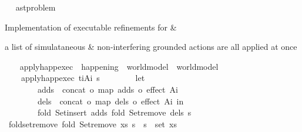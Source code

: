 \begin{isabellebody}
\ %
%
\isadelimdocument
%
\endisadelimdocument
%
\isatagdocument
%
\isamarkuptrue%
%
\endisatagdocument
{\isafolddocument}%
%
\isadelimdocument
%
\endisadelimdocument
{}\isamarkupfalse%
\ ast{\isacharunderscore}{\kern0pt}problem\ %
\begin{isamarkuptext}%
Implementation of executable refinements for  
  \& %
\end{isamarkuptext}\isamarkuptrue%
%
\begin{isamarkuptext}%
a list of simulataneous \& non-interfering grounded actions are all applied at once%
\end{isamarkuptext}\isamarkuptrue%
\ \ \isamarkupfalse%
\ apply{\isacharunderscore}{\kern0pt}happ{\isacharunderscore}{\kern0pt}exec\ {\isacharcolon}{\kern0pt}{\isacharcolon}{\kern0pt}\ {\isachardoublequoteopen}happening\ {\isasymRightarrow}\ world{\isacharunderscore}{\kern0pt}model\ {\isasymRightarrow}\ world{\isacharunderscore}{\kern0pt}model{\isachardoublequoteclose}\ \isanewline
\ \ \ \ {\isachardoublequoteopen}apply{\isacharunderscore}{\kern0pt}happ{\isacharunderscore}{\kern0pt}exec\ {\isacharparenleft}{\kern0pt}t\isactrlsub i{\isacharcomma}{\kern0pt}A\isactrlsub i{\isacharparenright}{\kern0pt}\ s\ {\isacharequal}{\kern0pt}\ \isanewline
\ \ \ \ \ \ {\isacharparenleft}{\kern0pt}let\ \isanewline
\ \ \ \ \ \ \ \ adds\ {\isacharequal}{\kern0pt}\ {\isacharparenleft}{\kern0pt}concat\ o\ {\isacharparenleft}{\kern0pt}map\ {\isacharparenleft}{\kern0pt}adds\ o\ effect{\isacharparenright}{\kern0pt}{\isacharparenright}{\kern0pt}{\isacharparenright}{\kern0pt}\ A\isactrlsub i{\isacharsemicolon}{\kern0pt}\ \isanewline
\ \ \ \ \ \ \ \ dels\ {\isacharequal}{\kern0pt}\ {\isacharparenleft}{\kern0pt}concat\ o\ {\isacharparenleft}{\kern0pt}map\ {\isacharparenleft}{\kern0pt}dels\ o\ effect{\isacharparenright}{\kern0pt}{\isacharparenright}{\kern0pt}{\isacharparenright}{\kern0pt}\ A\isactrlsub i\ in\ \isanewline
\ \ \ \ \ \ \ \ fold\ Set{\isachardot}{\kern0pt}insert\ adds\ {\isacharparenleft}{\kern0pt}fold\ Set{\isachardot}{\kern0pt}remove\ dels\ s{\isacharparenright}{\kern0pt}{\isacharparenright}{\kern0pt}{\isachardoublequoteclose}\isanewline
\isanewline
\ \ \isamarkupfalse%
\ fold{\isacharunderscore}{\kern0pt}set{\isacharunderscore}{\kern0pt}remove{\isacharcolon}{\kern0pt}\ {\isachardoublequoteopen}fold\ Set{\isachardot}{\kern0pt}remove\ xs\ s\ {\isacharequal}{\kern0pt}\ s\ {\isacharminus}{\kern0pt}\ set\ xs{\isachardoublequoteclose}\isanewline

\end{isabellebody}
